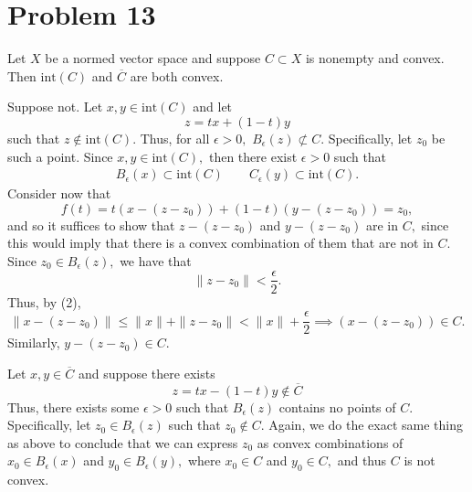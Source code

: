 \documentclass[11pt]{article}
\begin{document}
\section*{Problem 13}
\begin{problem}
    Let $X$ be a normed vector space and suppose $C\subset X$ is nonempty and convex. Then $\text{int}(C)$ and $\overline{C}$ are both convex.
\end{problem}
\begin{solution}
    Suppose not. Let $x, y \in \text{int}(C)$ and let
    \[z = tx + (1-t)y\] such that $z\notin \text{int}(C).$ Thus, for all $\epsilon>0,$ $B_\epsilon(z)\not\subset C.$ Specifically, let $z_0$ be such a point. Since $x, y \in \text{int} (C),$ then there exist $\epsilon>0$ such that 
    \begin{align}
    B_\epsilon(x) \subset \text{int}(C) \qquad C_\epsilon(y) \subset \text{int}(C).    
    \end{align}
    Consider now that
    \[f(t) = t(x - (z - z_0)) + (1-t)(y - (z - z_0)) = z_0,\] and so it suffices to show that $z - (z-z_0)$ and $y - (z - z_0)$ are in $C,$ since this would imply that there is a convex combination of them that are not in $C.$
    Since $z_0 \in B_\epsilon(z),$ we have that 
    \[\|z - z_0\|< \frac{\epsilon}{2}.\] Thus, by (2),
    \[\|x - (z - z_0)\| \leq \|x\| + \|z - z_0\|< \|x\| + \frac{\epsilon}{2} \implies (x- (z - z_0))\in C.\] Similarly, $y - (z - z_0)\in C.$
\end{solution}
\begin{solution}
    Let $x,y \in \overline{C}$ and suppose there exists 
    \[z= tx - (1-t)y\notin \overline{C}\] Thus, there exists some $\epsilon>0$ such that $B_\epsilon(z)$ contains no points of $C.$ Specifically, let $z_0 \in B_\epsilon(z)$ such that $z_0 \notin C.$ Again, we do the exact same thing as above to conclude that we can express $z_0$ as convex combinations of $x_0 \in B_\epsilon(x)$ and $y_0 \in B_\epsilon(y),$ where $x_0 \in C$ and $y_0 \in C,$ and thus $C$ is not convex. 
\end{solution}

\newpage
\end{document}
